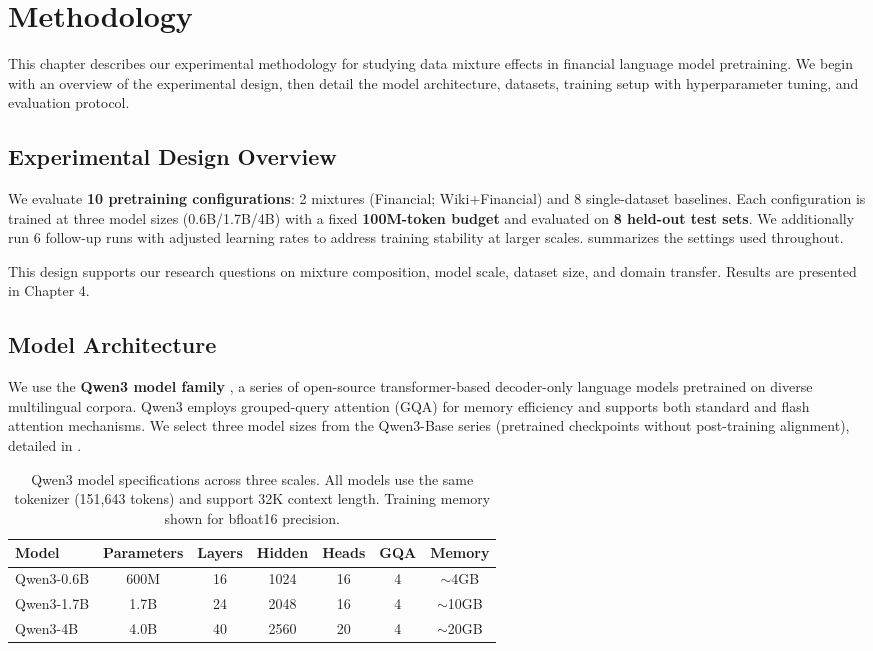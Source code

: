 \chapter{Methodology}

This chapter describes our experimental methodology for studying data mixture effects in financial language model pretraining. We begin with an overview of the experimental design, then detail the model architecture, datasets, training setup with hyperparameter tuning, and evaluation protocol.

\section{Experimental Design Overview}

We evaluate \textbf{10 pretraining configurations}: 2 mixtures (Financial; Wiki+Financial) and 8 single-dataset baselines. Each configuration is trained at three model sizes (0.6B/1.7B/4B) with a fixed \textbf{100M-token budget} and evaluated on \textbf{8 held-out test sets}. We additionally run 6 follow-up runs with adjusted learning rates to address training stability at larger scales.  summarizes the settings used throughout.



This design supports our research questions on mixture composition, model scale, dataset size, and domain transfer. Results are presented in Chapter 4.

\section{Model Architecture}

We use the \textbf{Qwen3 model family} \parencite{yang2024qwen2}, a series of open-source transformer-based decoder-only language models pretrained on diverse multilingual corpora. Qwen3 employs grouped-query attention (GQA) for memory efficiency and supports both standard and flash attention mechanisms. We select three model sizes from the Qwen3-Base series (pretrained checkpoints without post-training alignment), detailed in .

\begin{table}[h]
\centering
\caption[Qwen3 Model Specifications]{Qwen3 model specifications across three scales. All models use the same tokenizer (151,643 tokens) and support 32K context length. Training memory shown for bfloat16 precision.}
\label{tab:model_specs}
\begin{tabular}{lcccccc}
\toprule
\textbf{Model} & \textbf{Parameters} & \textbf{Layers} & \textbf{Hidden} & \textbf{Heads} & \textbf{GQA} & \textbf{Memory} \\
\midrule
Qwen3-0.6B & 600M & 16 & 1024 & 16 & 4 & $\sim$4GB \\
Qwen3-1.7B & 1.7B & 24 & 2048 & 16 & 4 & $\sim$10GB \\
Qwen3-4B & 4.0B & 40 & 2560 & 20 & 4 & $\sim$20GB \\
\bottomrule
\end{tabular}
\end{table}

